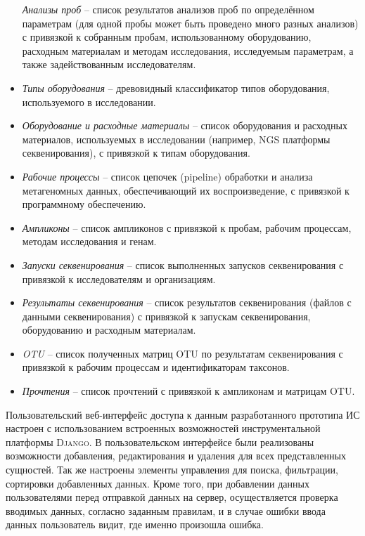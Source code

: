 \documentclass[a4paper,12pt,openany,final]{extreport}
\begin{document}
\begin{itemize}
  \emph{Анализы проб} -- список результатов анализов проб по
  определённом параметрам (для одной пробы может быть проведено много
  разных анализов) с привязкой к собранным пробам, использованному
  оборудованию, расходным материалам и методам исследования, исследуемым
  параметрам, а также задействованным исследователям.
\item
  \emph{Типы оборудования} -- древовидный классификатор типов
  оборудования, используемого в исследовании.
\item
  \emph{Оборудование и расходные материалы} -- список оборудования и
  расходных материалов, используемых в исследовании (например, NGS
  платформы секвенирования), с привязкой к типам оборудования.
\item
  \emph{Рабочие процессы} -- список цепочек (pipeline) обработки и
  анализа метагеномных данных, обеспечивающий их воспроизведение, с
  привязкой к программному обеспечению.
\item
  \emph{Ампликоны} -- список ампликонов с привязкой к пробам, рабочим
  процессам, методам исследования и генам.
\item
  \emph{Запуски секвенирования} -- список выполненных запусков
  секвенирования с привязкой к исследователям и организациям.
\item
  \emph{Результаты секвенирования} -- список результатов секвенирования
  (файлов с данными секвенирования) с привязкой к запускам
  секвенирования, оборудованию и расходным материалам.
\item
  \emph{OTU} -- список полученных матриц OTU по результатам
  секвенирования с привязкой к рабочим процессам и идентификаторам
  таксонов.
\item
  \emph{Прочтения} -- список прочтений с привязкой к ампликонам и
  матрицам OTU.
\end{itemize}

Пользовательский веб-интерфейс доступа к данным разработанного прототипа
ИС настроен с использованием встроенных возможностей инструментальной
платформы \textsc{Django}. В пользовательском интерфейсе были
реализованы возможности добавления, редактирования и удаления для всех
представленных сущностей. Так же настроены элементы управления для
поиска, фильтрации, сортировки добавленных данных. Кроме того, при
добавлении данных пользователями перед отправкой данных на сервер,
осуществляется проверка вводимых данных, согласно заданным правилам, и в
случае ошибки ввода данных пользователь видит, где именно произошла
ошибка.
\end{document}
